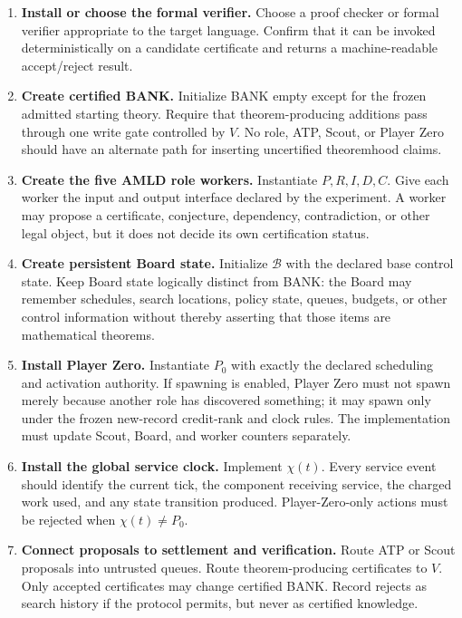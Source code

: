 \documentclass[11pt]{article}
\theoremstyle{definition}
\newcommand{\Board}{\mathcal{B}}
\begin{document}
\begin{enumerate}[label=\textbf{Install \arabic*.},leftmargin=*]
\item \textbf{Install or choose the formal verifier.}
Choose a proof checker or formal verifier appropriate to the target language. Confirm that it can be invoked deterministically on a candidate certificate and returns a machine-readable accept/reject result.

\item \textbf{Create certified BANK.}
Initialize BANK empty except for the frozen admitted starting theory. Require that theorem-producing additions pass through one write gate controlled by $V$. No role, ATP, Scout, or Player Zero should have an alternate path for inserting uncertified theoremhood claims.

\item \textbf{Create the five AMLD role workers.}
Instantiate $P,R,I,D,C$. Give each worker the input and output interface declared by the experiment. A worker may propose a certificate, conjecture, dependency, contradiction, or other legal object, but it does not decide its own certification status.

\item \textbf{Create persistent Board state.}
Initialize $\Board$ with the declared base control state. Keep Board state logically distinct from BANK: the Board may remember schedules, search locations, policy state, queues, budgets, or other control information without thereby asserting that those items are mathematical theorems.

\item \textbf{Install Player Zero.}
Instantiate $P_0$ with exactly the declared scheduling and activation authority. If spawning is enabled, Player Zero must not spawn merely because another role has discovered something; it may spawn only under the frozen new-record credit-rank and clock rules. The implementation must update Scout, Board, and worker counters separately.

\item \textbf{Install the global service clock.}
Implement $\chi(t)$. Every service event should identify the current tick, the component receiving service, the charged work used, and any state transition produced. Player-Zero-only actions must be rejected when $\chi(t)\neq P_0$.

\item \textbf{Connect proposals to settlement and verification.}
Route ATP or Scout proposals into untrusted queues. Route theorem-producing certificates to $V$. Only accepted certificates may change certified BANK. Record rejects as search history if the protocol permits, but never as certified knowledge.


\end{enumerate}
\end{document}
